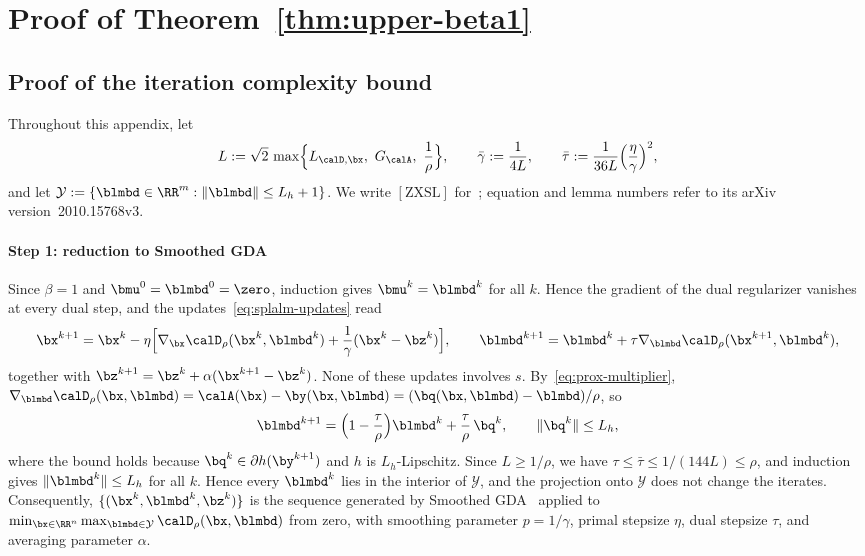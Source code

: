 \section{Proof of Theorem~\ref{thm:upper-beta1}}
\label{app:upper-beta1}

\subsection{Proof of the iteration complexity bound}

Throughout this appendix, let
\[
L:=\sqrt2\,\max\Bigl\{L_{\calD,\bx},\ G_{\calA},\ \frac1\rho\Bigr\},
\qquad
\bar\gamma:=\frac1{4L},
\qquad
\bar\tau:=\frac1{36L}\Bigl(\frac\eta\gamma\Bigr)^2,
\]
and let \(\mathcal Y:=\{\blmbd\in\RR^m:\|\blmbd\|\le L_h+1\}\). We write
\([\mathrm{ZXSL}]\) for~\cite{zhang2020smoothed}; equation and lemma numbers
refer to its arXiv version~2010.15768v3.

\paragraph{Step 1: reduction to Smoothed GDA}
Since \(\beta=1\) and \(\bmu^0=\blmbd^0=\zero\), induction gives
\(\bmu^k=\blmbd^k\) for all \(k\). Hence the gradient of the dual regularizer
vanishes at every dual step, and the updates~\eqref{eq:splalm-updates} read
\[
\bx^{k+1}=\bx^k-\eta\Bigl[\nabla_{\bx}\calD_\rho(\bx^k,\blmbd^k)
  +\frac1\gamma(\bx^k-\bz^k)\Bigr],
\qquad
\blmbd^{k+1}=\blmbd^k+\tau\nabla_{\blmbd}\calD_\rho(\bx^{k+1},\blmbd^k),
\]
together with \(\bz^{k+1}=\bz^k+\alpha(\bx^{k+1}-\bz^k)\). None of these
updates involves \(s\). By~\eqref{eq:prox-multiplier},
\(\nabla_{\blmbd}\calD_\rho(\bx,\blmbd)=\calA(\bx)-\by(\bx,\blmbd)
=(\bq(\bx,\blmbd)-\blmbd)/\rho\), so
\[
\blmbd^{k+1}=\Bigl(1-\frac\tau\rho\Bigr)\blmbd^k+\frac\tau\rho\,\bq^k,
\qquad \|\bq^k\|\le L_h,
\]
where the bound holds because \(\bq^k\in\partial h(\by^{k+1})\) and \(h\) is
\(L_h\)-Lipschitz. Since \(L\ge1/\rho\), we have
\(\tau\le\bar\tau\le1/(144L)\le\rho\), and induction gives
\(\|\blmbd^k\|\le L_h\) for all \(k\). Hence every \(\blmbd^k\) lies in the
interior of \(\mathcal Y\), and the projection onto \(\mathcal Y\) does not
change the iterates. Consequently, \(\{(\bx^k,\blmbd^k,\bz^k)\}\) is the
sequence generated by Smoothed GDA~\cite[Algorithm~2]{zhang2020smoothed}
applied to
\(\min_{\bx\in\RR^n}\max_{\blmbd\in\mathcal Y}\calD_\rho(\bx,\blmbd)\) from
zero, with smoothing parameter \(p=1/\gamma\), primal stepsize \(\eta\), dual
stepsize \(\tau\), and averaging parameter \(\alpha\).

